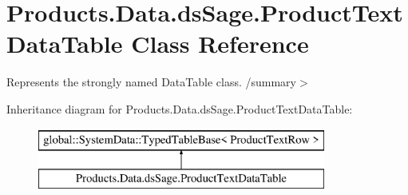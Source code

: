 \hypertarget{class_products_1_1_data_1_1ds_sage_1_1_product_text_data_table}{}\section{Products.\+Data.\+ds\+Sage.\+Product\+Text\+Data\+Table Class Reference}
\label{class_products_1_1_data_1_1ds_sage_1_1_product_text_data_table}


Represents the strongly named Data\+Table class. /summary$>$  


Inheritance diagram for Products.\+Data.\+ds\+Sage.\+Product\+Text\+Data\+Table\+:\begin{figure}[H]
\begin{center}
\leavevmode
\includegraphics[height=2.000000cm]{class_products_1_1_data_1_1ds_sage_1_1_product_text_data_table}
\end{center}
\end{figure}

